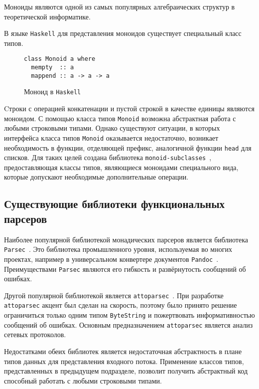 Моноиды являются одной из самых популярных алгебраических структур в теоретической информатике.

В языке \lstinline{Haskell} для представления моноидов существует специальный класс типов.

\begin{figure}[h]
\begin{lstlisting}
class Monoid a where
  mempty  :: a
  mappend :: a -> a -> a
\end{lstlisting}
\caption{Моноид в \lstinline{Haskell}}
\label{listing:Monoid}
\end{figure}

Cтроки с операцией конкатенации и пустой строкой в качестве единицы являются моноидом. С помощью класса типов \lstinline{Monoid} возможна абстрактная работа с любыми строковыми типами. Однако существуют ситуации, в которых интерфейса класса типов \lstinline{Monoid} оказывается недостаточно, возникает необходимость в функции, отделяющей префикс, аналогичной функции \lstinline{head} для списков. Для таких целей создана библиотека \lstinline{monoid-subclasses}~\autocite{MonoidSubclasses}, предоставляющая классы типов, являющиеся моноидами специального вида, которые допускают необходимые дополнительные операции.

\subsection{Существующие библиотеки функциональных парсеров}

Наиболее популярной библиотекой монадических парсеров является библиотека \lstinline{Parsec}~\autocite{Parsec}. Это библиотека промышленного уровня, используемая во многих проектах, например в универсальном конвертере документов \lstinline{Pandoc}~\autocite{Pandoc}. Преимуществами \lstinline{Parsec} являются его гибкость и развёрнутость сообщений об ошибках.

Другой популярной библиотекой является \lstinline{attoparsec}~\autocite{Attoparsec}. При разработке \lstinline{attoparsec} акцент был сделан на скорость, поэтому было принято решение ограничиться только одним типом \lstinline{ByteString} и пожертвовать информативностью сообщений об ошибках. Основным предназначением \lstinline{attoparsec} является анализ сетевых протоколов.

Недостатками обеих библиотек является недостаточная абстрактность в плане типов данных для представления входного потока. Применение классов типов, представленных в предыдущем подразделе, позволит получить абстрактный код способный работать с любыми строковыми типами.

